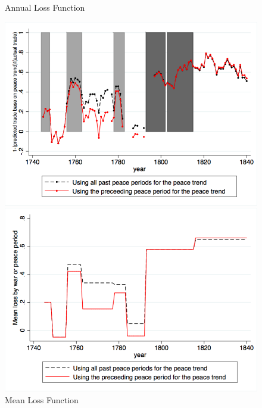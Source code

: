 \documentclass[12pt,a4paper,notitlepage,english]{article}
\begin{document}
\begin{center}
\begin{figure}[H]
\caption{Annual Loss Function}
\label{annual_loss_function}
\centering
\includegraphics[scale=.425]{Annual_loss_function.png}
\caption{Mean Loss Function}
\label{mean_loss_function}
\includegraphics[scale=.4]{Mean_loss_function.png}
\end{figure}
\end{center}
\end{document}
